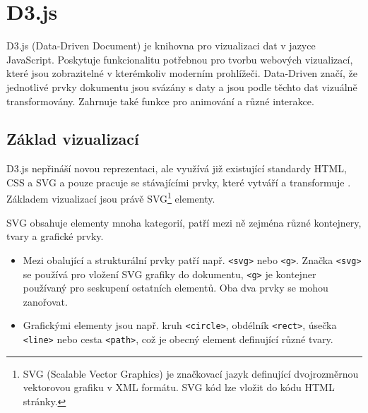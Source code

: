 \documentclass[
  digital, %
  oneside, %
  table,   %
  nolof,     %
  nolot,     %
]{fithesis3}
\begin{document}
\section{D3.js}
D3.js (Data-Driven Document) je knihovna pro vizualizaci dat v jazyce JavaScript. Poskytuje funkcionalitu potřebnou pro tvorbu webových vizualizací, které jsou zobrazitelné v kterémkoliv moderním prohlížeči. Data-Driven značí, že jednotlivé prvky dokumentu jsou svázány s daty a jsou podle těchto dat vizuálně transformovány. Zahrnuje také funkce pro animování a různé interakce.

\subsection{Základ vizualizací}
D3.js nepřináší novou reprezentaci, ale využívá již existující standardy HTML, CSS a SVG a pouze pracuje se stávajícími prvky, které vytváří a transformuje \cite{d3jsorg}. Základem vizualizací jsou právě SVG\footnote{SVG (Scalable Vector Graphics) je značkovací jazyk definující dvojrozměrnou vektorovou grafiku v XML formátu. SVG kód lze vložit do kódu HTML stránky.} elementy. \par
SVG obsahuje elementy mnoha kategorií, patří mezi ně zejména různé kontejnery, tvary a grafické prvky.
\begin{itemize}
  \item Mezi obalující a strukturální prvky patří např. \verb|<svg>| nebo \verb|<g>|. Značka \verb|<svg>| se používá pro vložení SVG grafiky do dokumentu, \verb|<g>| je kontejner používaný pro seskupení ostatních elementů. Oba dva prvky se mohou zanořovat.
  \item Grafickými elementy jsou např. kruh \verb|<circle>|, obdélník \verb|<rect>|, úsečka \verb|<line>| nebo cesta \verb|<path>|, což je obecný element definující různé tvary.
\end{itemize}
\end{document}

